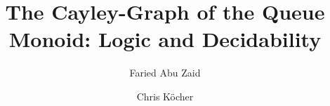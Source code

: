 \documentclass[a4paper,numberwithinsect,USenglish]{lipics-v2018}
\title{The Cayley-Graph of the Queue Monoid: Logic and Decidability}
\author{Faried Abu Zaid}{Technische Universität Ilmenau, Automata and Logics Group}{faried.abu-zaid@tu-ilmenau.de}{}{}
\author{Chris Köcher}{Technische Universität Ilmenau, Automata and Logics Group}{chris.koecher@tu-ilmenau.de}{https://orcid.org/0000-0003-4575-9339}{}
\theoremstyle{plain}
\theoremstyle{remark}
\begin{document}
	\maketitle

	\begin{abstract}
		
	\end{abstract}

	
	
	
	
	

	
	
\end{document}
